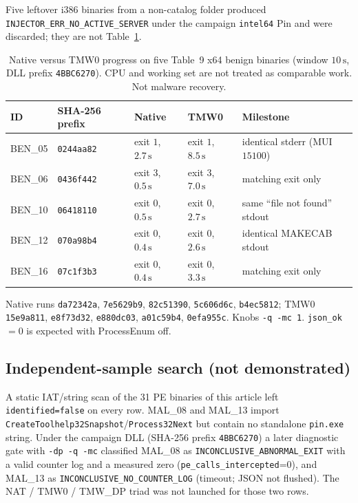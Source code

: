 \documentclass[pdflatex,sn-mathphys-num]{sn-jnl}
\theoremstyle{thmstyleone}
\theoremstyle{thmstyletwo}
\theoremstyle{thmstylethree}
\begin{document}
Five leftover i386 binaries from a non-catalog folder produced \texttt{INJECTOR\_ERR\_NO\_ACTIVE\_SERVER} under the campaign \texttt{intel64} Pin and were discarded; they are not Table~\ref{tab:prog_benign}.

\begin{table}[t]
\caption{Native versus TMW0 progress on five Table~9 x64 benign binaries (window $10\,\mathrm{s}$, DLL prefix \texttt{4BBC6270}). CPU and working set are not treated as comparable work. Not malware recovery.}
\label{tab:prog_benign}
\centering
\small
\begin{tabular}{lllll}
\toprule
\textbf{ID} & \textbf{SHA-256 prefix} & \textbf{Native} & \textbf{TMW0} & \textbf{Milestone} \\
\midrule
BEN\_05 & \texttt{0244aa82} & exit $1$, $2.7\,\mathrm{s}$ & exit $1$, $8.5\,\mathrm{s}$ & identical stderr (MUI $15100$) \\
BEN\_06 & \texttt{0436f442} & exit $3$, $0.5\,\mathrm{s}$ & exit $3$, $7.0\,\mathrm{s}$ & matching exit only \\
BEN\_10 & \texttt{06418110} & exit $0$, $0.5\,\mathrm{s}$ & exit $0$, $2.7\,\mathrm{s}$ & same ``file not found'' stdout \\
BEN\_12 & \texttt{070a98b4} & exit $0$, $0.4\,\mathrm{s}$ & exit $0$, $2.6\,\mathrm{s}$ & identical MAKECAB stdout \\
BEN\_16 & \texttt{07c1f3b3} & exit $0$, $0.4\,\mathrm{s}$ & exit $0$, $3.3\,\mathrm{s}$ & matching exit only \\
\bottomrule
\end{tabular}
\vspace{3pt}
\parbox{\textwidth}{\footnotesize Native runs \texttt{da72342a}, \texttt{7e5629b9}, \texttt{82c51390}, \texttt{5c606d6c}, \texttt{b4ec5812}; TMW0 \texttt{15e9a811}, \texttt{e8f73d32}, \texttt{e880dc03}, \texttt{a01c59b4}, \texttt{0efa955c}. Knobs \texttt{-q -mc 1}. \texttt{json\_ok}$=0$ is expected with ProcessEnum off.}
\end{table}

\subsection{Independent-sample search (not demonstrated)}
\label{subsec:case_search}

A static IAT/string scan of the 31 PE binaries of this article left \texttt{identified=false} on every row. MAL\_08 and MAL\_13 import \texttt{CreateToolhelp32Snapshot}/\texttt{Process32Next} but contain no standalone \texttt{pin.exe} string. Under the campaign DLL (SHA-256 prefix \texttt{4BBC6270}) a later diagnostic gate with \texttt{-dp -q -mc} classified MAL\_08 as \texttt{INCONCLUSIVE\_ABNORMAL\_EXIT} with a valid counter log and a measured zero (\texttt{pe\_calls\_intercepted}=0), and MAL\_13 as \texttt{INCONCLUSIVE\_NO\_COUNTER\_LOG} (timeout; JSON not flushed). The NAT / TMW0 / TMW\_DP triad was not launched for those two rows.
\end{document}
